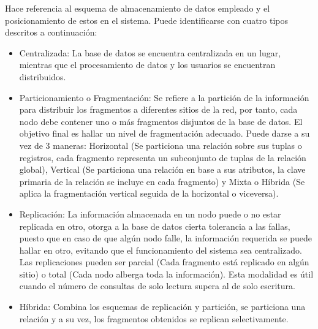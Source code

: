 Hace referencia al esquema de almacenamiento de datos empleado y el posicionamiento de estos en el sistema. Puede identificarse con cuatro tipos descritos a continuación:
\begin{itemize}
\item Centralizada: La base de datos se encuentra centralizada en un lugar, mientras que el procesamiento de datos y los usuarios se encuentran distribuidos.\cite{51dd}
\item Particionamiento o Fragmentación: Se refiere a la partición de la información para distribuir los fragmentos a diferentes sitios de la red, por tanto, cada nodo debe contener uno  o más fragmentos disjuntos de la base de datos. El objetivo final es hallar un nivel de fragmentación adecuado. Puede darse a su vez de 3 maneras: Horizontal (Se particiona una relación sobre sus tuplas o registros, cada fragmento representa un subconjunto de tuplas de la relación global), Vertical (Se particiona una relación en base a sus atributos, la clave primaria de la relación se incluye en cada fragmento)  y Mixta o Híbrida (Se aplica la fragmentación vertical seguida de la horizontal o viceversa).\cite{51dd}
\item Replicación: La información almacenada en un nodo puede o  no estar replicada en otro, otorga a la base de datos cierta tolerancia a las fallas, puesto que en caso de que algún nodo falle, la información requerida se puede hallar en otro, evitando que el funcionamiento del sistema sea centralizado. Las replicaciones pueden ser parcial (Cada fragmento está replicado en algún sitio) o total (Cada nodo alberga toda la información). Esta modalidad es útil cuando el número de consultas de solo lectura supera al de solo escritura.\cite{51dd}

\item Híbrida: Combina los esquemas de replicación y partición, se particiona una relación y a su vez, los fragmentos obtenidos se replican selectivamente.\cite{51dd}
\end{itemize} 
